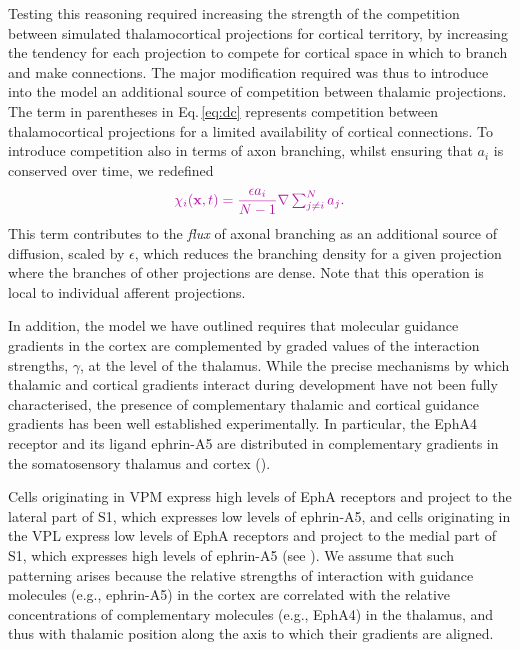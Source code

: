 \documentclass[9pt,lineno]{elife}
\newcommand{\cmnt}[1]{\textcolor{colcmnt}{#1}}
\newcommand{\mb}[1]{\mathbf{#1}}
\begin{document}
\cmnt{Testing this reasoning required increasing the strength of the
  competition between simulated thalamocortical projections for cortical
  territory, by increasing the tendency for each projection to compete for
  cortical space in which to branch and make connections. The major
  modification required
  was thus to introduce into the model an additional source of competition
  between thalamic projections.}
%
The term in parentheses in Eq.\,\ref{eq:dc} represents competition between
thalamocortical projections for a limited availability of cortical
connections. To introduce competition also in terms of axon branching,
\cmnt{whilst ensuring that $a_i$ is conserved over time,} we
redefined
%
\begin{equation} \label{eq:comp}
  \color{colcmnt}
  \chi_i(\mb{x}, t) = \frac{\epsilon a_i}{N-1} \nabla \textstyle\sum_{j\ne i}^{N}{a_j}.
  \color{black}
\end{equation}
%
\cmnt{This term contributes to the \emph{flux} of axonal branching as an
  additional source of diffusion, scaled by $\epsilon$, which reduces the
  branching density for a given projection where the branches of other
  projections are dense. Note that this operation is local to individual
  afferent projections.}

\cmnt{In addition, the model we have outlined requires that molecular
  guidance gradients in the cortex are complemented by graded values of the
  interaction strengths, $\gamma$, at the level of the thalamus. While the
  precise mechanisms by which thalamic and cortical gradients interact during
  development have not been fully characterised, the presence of complementary
  thalamic and cortical guidance gradients has been well established
  experimentally. In particular, the EphA4 receptor and its ligand ephrin-A5
  are distributed in complementary gradients in the somatosensory thalamus and
  cortex} (\citealp{vanderhaeghen_mapping_2000,miller_epha7-ephrin-a5_2006}).

\cmnt{Cells originating in VPM express high levels of EphA receptors and
  project to the lateral part of S1, which expresses low levels of ephrin-A5,
  and cells originating in the VPL express low levels of EphA receptors and
  project to the medial part of S1, which expresses high levels of ephrin-A5}
(see
\citealp{gao_regulation_1998,dufour_area_2003,vanderhaeghen_developmental_2004,speer_grading_2005,torii_role_2013}).
\cmnt{We assume that such patterning arises because the relative strengths of
  interaction with guidance molecules (e.g., ephrin-A5) in the cortex are
  correlated with the relative concentrations of complementary molecules
  (e.g., EphA4) in the thalamus, and thus with thalamic position along the
  axis to which their gradients are aligned.}
\end{document}
